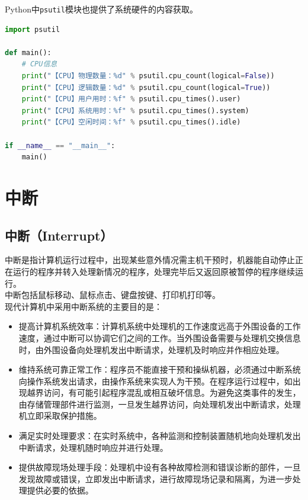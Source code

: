 Python中\lstinline|psutil|模块也提供了系统硬件的内容获取。

\begin{lstlisting}[language=Python, title=获取系统硬件信息]
import psutil

def main():
	# CPU信息
	print("【CPU】物理数量：%d" % psutil.cpu_count(logical=False))
	print("【CPU】逻辑数量：%d" % psutil.cpu_count(logical=True))
	print("【CPU】用户用时：%f" % psutil.cpu_times().user)
	print("【CPU】系统用时：%f" % psutil.cpu_times().system)
	print("【CPU】空闲时间：%f" % psutil.cpu_times().idle)

if __name__ == "__main__":
	main()
\end{lstlisting}

\newpage

\section{中断}

\subsection{中断（Interrupt）}

中断是指计算机运行过程中，出现某些意外情况需主机干预时，机器能自动停止正在运行的程序并转入处理新情况的程序，处理完毕后又返回原被暂停的程序继续运行。 \\

中断包括鼠标移动、鼠标点击、键盘按键、打印机打印等。 \\

现代计算机中采用中断系统的主要目的是：

\begin{itemize}
	\item 提高计算机系统效率：计算机系统中处理机的工作速度远高于外围设备的工作速度，通过中断可以协调它们之间的工作。当外围设备需要与处理机交换信息时，由外围设备向处理机发出中断请求，处理机及时响应并作相应处理。

	\item 维持系统可靠正常工作：程序员不能直接干预和操纵机器，必须通过中断系统向操作系统发出请求，由操作系统来实现人为干预。在程序运行过程中，如出现越界访问，有可能引起程序混乱或相互破坏信息。为避免这类事件的发生，由存储管理部件进行监测，一旦发生越界访问，向处理机发出中断请求，处理机立即采取保护措施。

	\item 满足实时处理要求：在实时系统中，各种监测和控制装置随机地向处理机发出中断请求，处理机随时响应并进行处理。

	\item 提供故障现场处理手段：处理机中设有各种故障检测和错误诊断的部件，一旦发现故障或错误，立即发出中断请求，进行故障现场记录和隔离，为进一步处理提供必要的依据。
\end{itemize}

